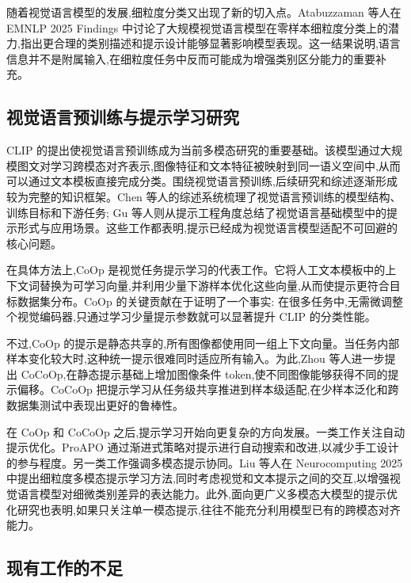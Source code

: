随着视觉语言模型的发展,细粒度分类又出现了新的切入点。Atabuzzaman 等人在 EMNLP 2025 Findings 中讨论了大规模视觉语言模型在零样本细粒度分类上的潜力,指出更合理的类别描述和提示设计能够显著影响模型表现\cite{atabuzzaman2025zero}。这一结果说明,语言信息并不是附属输入,在细粒度任务中反而可能成为增强类别区分能力的重要补充。

\subsection{视觉语言预训练与提示学习研究}

CLIP 的提出使视觉语言预训练成为当前多模态研究的重要基础\cite{clip2021}。该模型通过大规模图文对学习跨模态对齐表示,图像特征和文本特征被映射到同一语义空间中,从而可以通过文本模板直接完成分类。围绕视觉语言预训练,后续研究和综述逐渐形成较为完整的知识框架。Chen 等人的综述系统梳理了视觉语言预训练的模型结构、训练目标和下游任务\cite{chen2023vlp}; Gu 等人则从提示工程角度总结了视觉语言基础模型中的提示形式与应用场景\cite{gu2023prompt}。这些工作都表明,提示已经成为视觉语言模型适配不可回避的核心问题。

在具体方法上,CoOp 是视觉任务提示学习的代表工作\cite{coop2022}。它将人工文本模板中的上下文词替换为可学习向量,并利用少量下游样本优化这些向量,从而使提示更符合目标数据集分布。CoOp 的关键贡献在于证明了一个事实: 在很多任务中,无需微调整个视觉编码器,只通过学习少量提示参数就可以显著提升 CLIP 的分类性能。

不过,CoOp 的提示是静态共享的,所有图像都使用同一组上下文向量。当任务内部样本变化较大时,这种统一提示很难同时适应所有输入。为此,Zhou 等人进一步提出 CoCoOp,在静态提示基础上增加图像条件 token,使不同图像能够获得不同的提示偏移\cite{cocoop2022}。CoCoOp 把提示学习从任务级共享推进到样本级适配,在少样本泛化和跨数据集测试中表现出更好的鲁棒性。

在 CoOp 和 CoCoOp 之后,提示学习开始向更复杂的方向发展。一类工作关注自动提示优化。ProAPO 通过渐进式策略对提示进行自动搜索和改进,以减少手工设计的参与程度\cite{qu2025proapo}。另一类工作强调多模态提示协同。Liu 等人在 Neurocomputing 2025 中提出细粒度多模态提示学习方法,同时考虑视觉和文本提示之间的交互,以增强视觉语言模型对细微类别差异的表达能力\cite{liu2025fgmpl}。此外,面向更广义多模态大模型的提示优化研究也表明,如果只关注单一模态提示,往往不能充分利用模型已有的跨模态对齐能力\cite{choi2025multimodal}。

\subsection{现有工作的不足}

